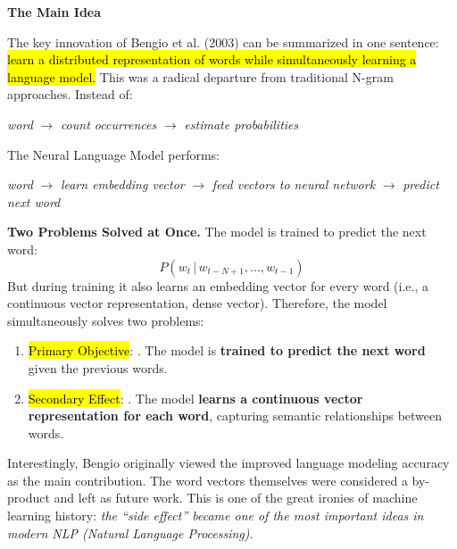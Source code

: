 \begin{flushleft}
    \textcolor{Green3}{ \textbf{The Main Idea}}
\end{flushleft}
The key innovation of Bengio et al. (2003) can be summarized in one sentence: \hl{learn a distributed representation of words while simultaneously learning a language model.} This was a radical departure from traditional N-gram approaches. Instead of:
\begin{center}
    \emph{word} $\to$ \emph{count occurrences} $\to$ \emph{estimate probabilities}
\end{center}
The Neural Language Model performs:
\begin{center}
    \emph{word} $\to$ \emph{learn embedding vector} $\to$ \emph{feed vectors to neural network} $\to$ \emph{predict next word}
\end{center}
\textcolor{Green3}{ \textbf{Two Problems Solved at Once.}} The model is trained to predict the next word:
\begin{equation*}
    P\left(w_t \, | \, w_{t-N+1}, \dots, w_{t-1}\right)
\end{equation*}
But during training it also learns an embedding vector for every word (i.e., a continuous vector representation, dense vector). Therefore, the model simultaneously solves two problems:
\begin{enumerate}
    \item \hl{Primary Objective}: . The model is \textbf{trained to predict the next word} given the previous words.
    \item \hl{Secondary Effect}: . The model \textbf{learns a continuous vector representation for each word}, capturing semantic relationships between words.
\end{enumerate}
Interestingly, Bengio originally viewed the improved language modeling accuracy as the main contribution. The word vectors themselves were considered a by-product and left as future work. This is one of the great ironies of machine learning history: \emph{the ``side effect'' became one of the most important ideas in modern NLP (Natural Language Processing)}.

